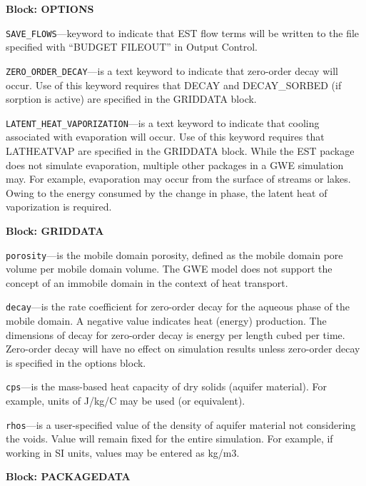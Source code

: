 
\item \textbf{Block: OPTIONS}

\begin{description}
\item \texttt{SAVE\_FLOWS}---keyword to indicate that EST flow terms will be written to the file specified with ``BUDGET FILEOUT'' in Output Control.

\item \texttt{ZERO\_ORDER\_DECAY}---is a text keyword to indicate that zero-order decay will occur.  Use of this keyword requires that DECAY and DECAY\_SORBED (if sorption is active) are specified in the GRIDDATA block.

\item \texttt{LATENT\_HEAT\_VAPORIZATION}---is a text keyword to indicate that cooling associated with evaporation will occur.  Use of this keyword requires that LATHEATVAP are specified in the GRIDDATA block.  While the EST package does not simulate evaporation, multiple other packages in a GWE simulation may.  For example, evaporation may occur from the surface of streams or lakes.  Owing to the energy consumed by the change in phase, the latent heat of vaporization is required.

\end{description}
\item \textbf{Block: GRIDDATA}

\begin{description}
\item \texttt{porosity}---is the mobile domain porosity, defined as the mobile domain pore volume per mobile domain volume.  The GWE model does not support the concept of an immobile domain in the context of heat transport.

\item \texttt{decay}---is the rate coefficient for zero-order decay for the aqueous phase of the mobile domain.  A negative value indicates heat (energy) production.  The dimensions of decay for zero-order decay is energy per length cubed per time.  Zero-order decay will have no effect on simulation results unless zero-order decay is specified in the options block.

\item \texttt{cps}---is the mass-based heat capacity of dry solids (aquifer material). For example, units of J/kg/C may be used (or equivalent).

\item \texttt{rhos}---is a user-specified value of the density of aquifer material not considering the voids. Value will remain fixed for the entire simulation.  For example, if working in SI units, values may be entered as kg/m3.

\end{description}
\item \textbf{Block: PACKAGEDATA}


